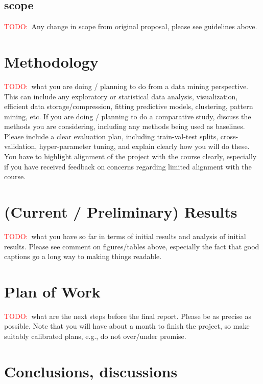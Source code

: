 \documentclass[11pt]{extarticle}
\newcommand{\todo}{\textcolor{red}{TODO:}~}
\begin{document}
\subsection{scope} 
\todo Any change in scope from original proposal, please see guidelines above. 

\section{Methodology} 
\todo what you are doing / planning to do from a data mining perspective. This can include any exploratory or statistical data analysis, visualization, efficient data storage/compression, fitting predictive models, clustering, pattern mining, etc.  If you are doing / planning to do a comparative study, discuss the methods you are considering, including any methods being used as baselines.  Please include a clear evaluation plan, including train-val-test splits, cross-validation, hyper-parameter tuning, and explain clearly how you will do these. You have to highlight alignment of the project with the course clearly, especially if you have received feedback on concerns regarding limited alignment with the course. 

\section{(Current / Preliminary) Results} 
\todo what you have so far in terms of initial results and analysis of initial results. Please see comment on figures/tables above, especially the fact that good captions go a long way to making things readable.

\section{Plan of Work} 
\todo what are the next steps before the final report. Please be as precise as possible. Note that you will have about a month to finish the project, so make suitably calibrated plans, e.g., do not over/under promise.

\section{Conclusions, discussions}



\end{document}
